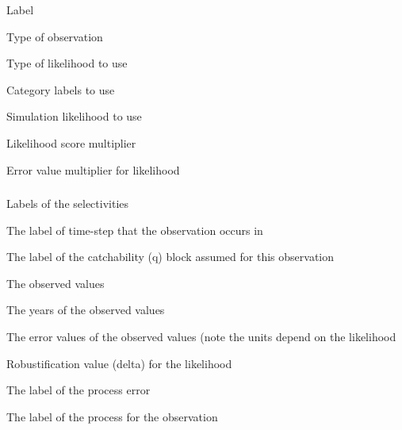 
 {Label}

 {Type of observation}

 {Type of likelihood to use}

 {Category labels to use}

 {Simulation likelihood to use}

 {Likelihood score multiplier}

 {Error value multiplier for likelihood}

\subsubsection[Process Abundance]{}

 {Labels of the selectivities}

 {The label of time-step that the observation occurs in}

 {The label of the catchability (q) block assumed for this observation}

 {The observed values}

 {The years of the observed values}

 {The error values of the observed values (note the units depend on the likelihood}

 {Robustification value (delta) for the likelihood}

 {The label of the process error}

 {The label of the process for the observation}

